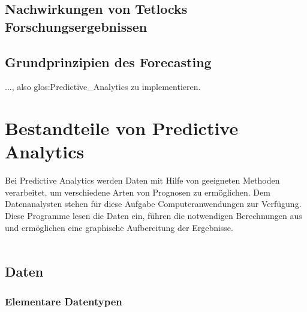 \subsection{Nachwirkungen von Tetlocks Forschungsergebnissen}


\subsection{Grundprinzipien des Forecasting}



..., also \gls{glos:Predictive_Analytics} zu implementieren.

\section{Bestandteile von Predictive Analytics}

Bei Predictive Analytics werden Daten mit Hilfe von geeigneten Methoden
verarbeitet, um verschiedene Arten von Prognosen zu ermöglichen. Dem
Datenanalysten stehen für diese Aufgabe Computeranwendungen zur Verfügung.
Diese Programme lesen die Daten ein, führen die notwendigen Berechnungen aus und
ermöglichen eine graphische Aufbereitung der Ergebnisse. \\ \\

\subsection{Daten}

\subsubsection{Elementare Datentypen}

